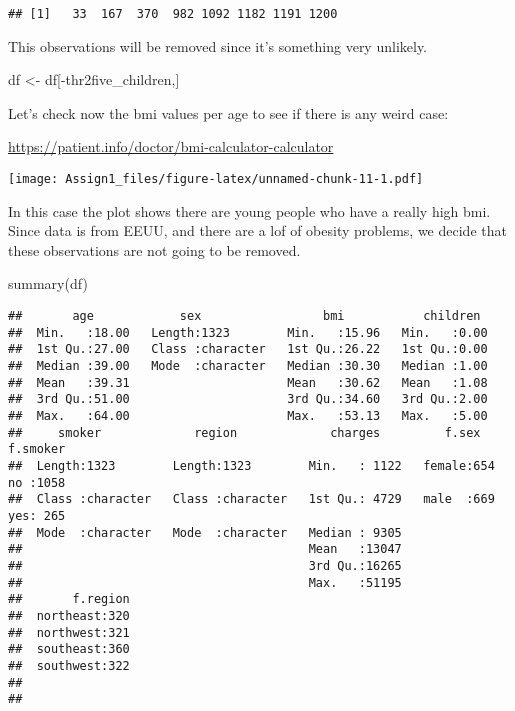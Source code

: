 \documentclass[
]{article}
\newenvironment{Shaded}{\begin{snugshade}}{\end{snugshade}}
\newcommand{\FunctionTok}[1]{\textcolor[rgb]{0.00,0.00,0.00}{#1}}
\newcommand{\NormalTok}[1]{#1}
\newcommand{\OtherTok}[1]{\textcolor[rgb]{0.56,0.35,0.01}{#1}}
\newcommand{\SpecialCharTok}[1]{\textcolor[rgb]{0.00,0.00,0.00}{#1}}
\begin{document}
\begin{verbatim}
## [1]   33  167  370  982 1092 1182 1191 1200
\end{verbatim}

This observations will be removed since it's something very unlikely.

\begin{Shaded}
\begin{Highlighting}[]
\NormalTok{df }\OtherTok{\textless{}{-}}\NormalTok{ df[}\SpecialCharTok{{-}}\NormalTok{thr2five\_children,]}
\end{Highlighting}
\end{Shaded}

Let's check now the bmi values per age to see if there is any weird
case:

\url{https://patient.info/doctor/bmi-calculator-calculator}

\begin{Shaded}
\end{Shaded}

\texttt{[image: Assign1\_files/figure-latex/unnamed-chunk-11-1.pdf]}

In this case the plot shows there are young people who have a really
high bmi. Since data is from EEUU, and there are a lof of obesity
problems, we decide that these observations are not going to be removed.

\begin{Shaded}
\begin{Highlighting}[]
\FunctionTok{summary}\NormalTok{(df)}
\end{Highlighting}
\end{Shaded}

\begin{verbatim}
##       age            sex                 bmi           children   
##  Min.   :18.00   Length:1323        Min.   :15.96   Min.   :0.00  
##  1st Qu.:27.00   Class :character   1st Qu.:26.22   1st Qu.:0.00  
##  Median :39.00   Mode  :character   Median :30.30   Median :1.00  
##  Mean   :39.31                      Mean   :30.62   Mean   :1.08  
##  3rd Qu.:51.00                      3rd Qu.:34.60   3rd Qu.:2.00  
##  Max.   :64.00                      Max.   :53.13   Max.   :5.00  
##     smoker             region             charges         f.sex     f.smoker  
##  Length:1323        Length:1323        Min.   : 1122   female:654   no :1058  
##  Class :character   Class :character   1st Qu.: 4729   male  :669   yes: 265  
##  Mode  :character   Mode  :character   Median : 9305                          
##                                        Mean   :13047                          
##                                        3rd Qu.:16265                          
##                                        Max.   :51195                          
##       f.region  
##  northeast:320  
##  northwest:321  
##  southeast:360  
##  southwest:322  
##                 
## 
\end{verbatim}
\end{document}
